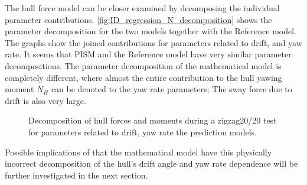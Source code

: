 The hull force model can be closer examined by decomposing the individual parameter contributions. \autoref{fig:ID_regression_N_decomposition} shows the parameter decomposition for the two models together with the Reference model. The graphs show the joined contributions for parameters related to drift, and yaw rate. It seems that PISM and the Reference model have very similar parameter decompositions.
The parameter decomposition of the mathematical model is completely different, where almost the entire contribution to the hull yawing moment $N_H$ can be denoted to the yaw rate parameters; The sway force due to drift is also very large.  
\begin{figure}[h]
    \begin{center}
        
        \caption{Decomposition of hull forces and moments during a zigzag20/20 test for parameters related to drift, yaw rate the prediction models.}
        \label{fig:ID_regression_N_decomposition}
    \end{center}
\end{figure}
Possible implications of that the mathematical model have this physically incorrect decomposition of the hull's drift angle and yaw rate dependence will be further investigated in the next section.